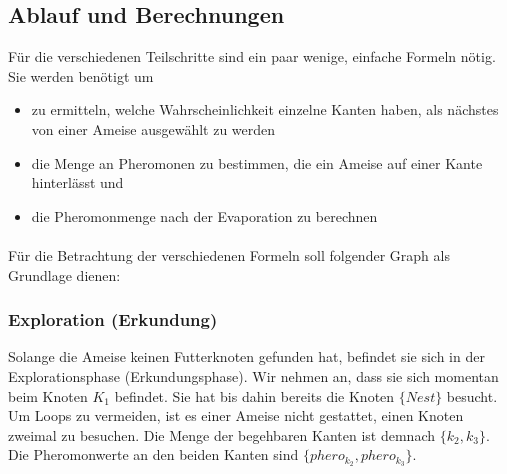 \subsection{Ablauf und Berechnungen}

Für die verschiedenen Teilschritte sind ein paar wenige, einfache Formeln nötig. Sie werden benötigt um

\begin{itemize}
\item zu ermitteln, welche Wahrscheinlichkeit einzelne Kanten haben, als nächstes von einer Ameise ausgewählt zu werden
\item die Menge an Pheromonen zu bestimmen, die ein Ameise auf einer Kante hinterlässt und
\item die Pheromonmenge nach der Evaporation zu berechnen
\end{itemize}

\paragraph*{}
Für die Betrachtung der verschiedenen Formeln soll folgender Graph als Grundlage dienen:

\paragraph*{}

\subsubsection*{Exploration (Erkundung)}

Solange die Ameise keinen Futterknoten gefunden hat, befindet sie sich in der Explorationsphase (Erkundungsphase). Wir nehmen an, dass sie sich momentan beim Knoten $K_1$ befindet. Sie hat bis dahin bereits die Knoten $\{Nest\}$ besucht. Um Loops zu vermeiden, ist es einer Ameise nicht gestattet, einen Knoten zweimal zu besuchen. Die Menge der begehbaren Kanten ist demnach $\{k_2, k_3\}$. Die Pheromonwerte an den beiden Kanten sind $\{phero_{k_2}, phero_{k_3}\}$. 

